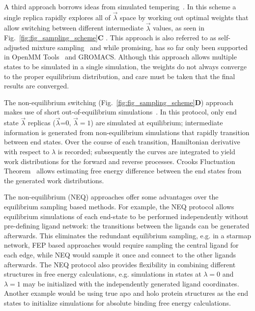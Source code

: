 \documentclass[9pt,bestpractices]{livecoms}
\begin{document}
A third approach borrows ideas from simulated tempering~\cite{marinari1992simulated}. In this scheme a single replica rapidly explores all of $\vec{\lambda}$ space by working out optimal weights that allow switching between different intermediate $\vec{\lambda}$ values, as seen in Fig.~\ref{fig:fig_sampling_scheme}\textbf{C} . This approach is also referred to as self-adjusted mixture sampling~\cite{lyubartsev1992new, li2007simulated, tan2017optimally} and while promising, has so far only been supported in OpenMM Tools~\cite{andrearizzi2019choderalab} and GROMACS.  Although this approach allows multiple states to be simulated in a single simulation, the weights do not always converge to the proper equilibrium distribution, and care must be taken that the final results are converged. 

The non-equilibrium switching (Fig.~\ref{fig:fig_sampling_scheme}\textbf{D}) approach makes use of short out-of-equilibrium simulations~\cite{aldeghi2018accurate}. In this protocol, only end state $\vec{\lambda}$ replicas ($\vec{\lambda}$=0, $\vec{\lambda}=1$) are simulated at equilibrium; intermediate information is generated from non-equilibrium simulations that rapidly transition between end states. 
Over the course of each transition, Hamiltonian derivative with respect to $\lambda$ is recorded; subsequently the curves are integrated to yield work distributions for the forward and reverse processes. Crooks Fluctuation Theorem~\cite{crooks1999entropy} allows estimating free energy difference between the end states from the generated work distributions.~\cite{shirts2003equilibrium}

The non-equilibrium (NEQ) approaches offer some advantages over the equilibrium sampling based methods. For example, the NEQ protocol allows equilibrium simulations of each end-state to be performed independently without pre-defining ligand network: the transitions between the ligands can be generated afterwards. This eliminates the redundant equilibrium sampling, e.g. in a starmap network, FEP based approaches would require sampling the central ligand for each edge, while NEQ would sample it once and connect to the other ligands afterwards. The NEQ protocol also provides flexibility in combining different structures in free energy calculations, e.g. simulations in states at $\lambda=0$ and $\lambda=1$ may be initialized with the independently generated ligand coordinates. Another example would be using true apo and holo protein structures as the end states to initialize simulations for absolute binding free energy calculations. 
\end{document}
